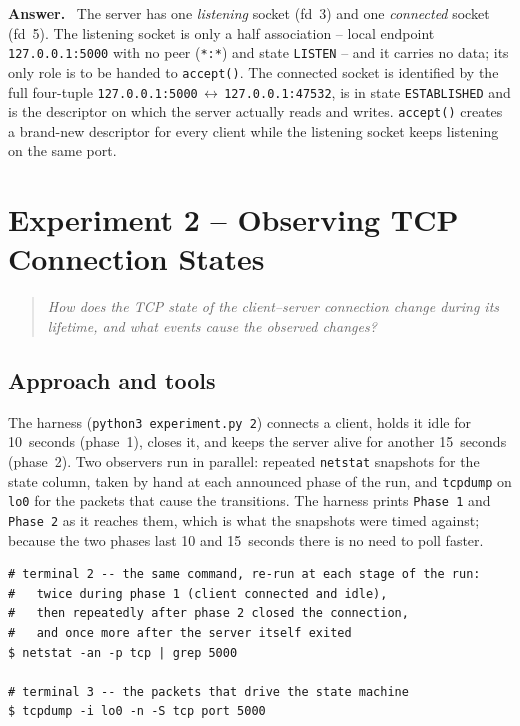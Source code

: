\documentclass[11pt,a4paper]{article}
\newcommand{\qbox}[1]{%
  \begin{quote}\itshape #1\end{quote}%
}
\newenvironment{answer}
  {\begin{answerbox}\textbf{\color{accent}Answer.}\ }
  {\end{answerbox}}
\begin{document}
\begin{answer}
The server has one \emph{listening} socket (fd~3) and one \emph{connected} socket
(fd~5).  The listening socket is only a half association -- local endpoint
\texttt{127.0.0.1:5000} with no peer (\texttt{*:*}) and state \texttt{LISTEN} -- and it
carries no data; its only role is to be handed to \texttt{accept()}.  The connected
socket is identified by the full four-tuple
\texttt{127.0.0.1:5000}\,$\leftrightarrow$\,\texttt{127.0.0.1:47532}, is in state
\texttt{ESTABLISHED} and is the descriptor on which the server actually reads and
writes.  \texttt{accept()} creates a brand-new descriptor for every client while the
listening socket keeps listening on the same port.
\end{answer}

\section{Experiment 2 -- Observing TCP Connection States}

\qbox{How does the TCP state of the client--server connection change during its
lifetime, and what events cause the observed changes?}

\subsection*{Approach and tools}

The harness (\texttt{python3 experiment.py 2}) connects a client, holds it idle for
10~seconds (phase~1), closes it, and keeps the server alive for another 15~seconds
(phase~2).  Two observers run in parallel: repeated \texttt{netstat} snapshots for the
state column, taken by hand at each announced phase of the run, and \texttt{tcpdump} on
\texttt{lo0} for the packets that cause the transitions.  The harness prints
\texttt{Phase~1} and \texttt{Phase~2} as it reaches them, which is what the snapshots
were timed against; because the two phases last 10 and 15~seconds there is no need to
poll faster.

\begin{lstlisting}
# terminal 2 -- the same command, re-run at each stage of the run:
#   twice during phase 1 (client connected and idle),
#   then repeatedly after phase 2 closed the connection,
#   and once more after the server itself exited
$ netstat -an -p tcp | grep 5000

# terminal 3 -- the packets that drive the state machine
$ tcpdump -i lo0 -n -S tcp port 5000
\end{lstlisting}
\end{document}
